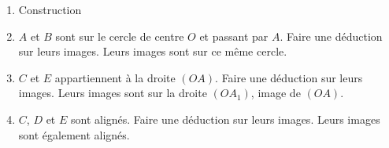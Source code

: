 \begin{corrige}
    \begin{enumerate}
        \item {\red Construction}%
        \item $A$ et $B$ sont sur le cercle de centre $O$ et passant par $A$. Faire une déduction sur leurs images.
        {\red Leurs images sont sur ce même cercle.}
        \item $C$ et $E$ appartiennent à la droite $(OA)$. Faire une déduction sur leurs images.
        {\red Leurs images sont sur la droite $(OA_1)$, image de $(OA)$.}
        \item $C$, $D$ et $E$ sont alignés. Faire une déduction sur leurs images.
        {\red Leurs images sont également alignés.}
    \end{enumerate}
\end{corrige}


